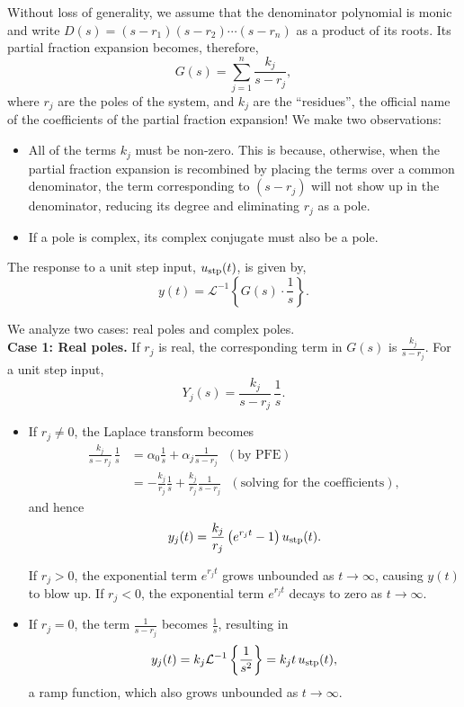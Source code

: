 Without loss of generality, we assume that the denominator polynomial is monic and write $D(s) = (s-r_1) (s - r_2) \cdots (s-r_n)$ as a product of its roots. Its partial fraction expansion becomes, therefore, 
\[
G(s) = \sum_{j=1}^n \frac{k_j}{s - r_j},
\]
where \(r_j\) are the poles of the system, and \(k_j\) are the ``residues'', the official name of the coefficients of the partial fraction expansion! We make two observations:
\begin{itemize}
    \item All of the terms $k_j$ must be non-zero. This is because, otherwise, when the partial fraction expansion is recombined by placing the terms over a common denominator, the term corresponding to $(s - r_j)$ will not show up in the denominator, reducing its degree and eliminating $r_j$ as a pole. 

    \item If a pole is complex, its complex conjugate must also be a pole. 
\end{itemize}

The response to a unit step input, \(u_{\rm stp}(t)\), is given by,
\[
y(t) = \mathcal{L}^{-1} \left\{ G(s) \cdot \frac{1}{s} \right\}.
\]

We analyze two cases: real poles and complex poles.\\

\textbf{Case 1: Real poles.}  
If \(r_j\) is real, the corresponding term in \(G(s)\) is \(\frac{k_j}{s - r_j}\). For a unit step input,
\[
Y_j(s)  = \frac{k_j}{s - r_j} \, \frac{1}{s}.  
\]
\begin{itemize}
    \item If \(r_j \neq 0\), the Laplace transform becomes
    \[
\begin{aligned}
  \frac{k_j}{s - r_j} \, \frac{1}{s}  & = \alpha_0 \frac{1}{s} + \alpha_j \frac{1}{s - r_j}  ~~~(\text{by PFE})\\
     & = -\frac{k_j}{r_j} \frac{1}{s} + \frac{k_j}{r_j} \frac{1}{s - r_j} ~~~(\text{solving for the coefficients}),
\end{aligned}
\]
and hence 
\[  y_j(t) = \frac{k_j}{r_j} \left( e^{r_j t} -1\right) u_{\rm stp}(t). \]

 
    If $r_j>0$, the exponential term \(e^{r_j t}\) grows unbounded as \(t \to \infty\), causing \(y(t)\) to blow up. If $r_j<0$, the exponential term \(e^{r_j t}\) decays to zero as \(t \to \infty\).
\item If \(r_j = 0\), the term \(\frac{1}{s - r_j}\) becomes \(\frac{1}{s}\), resulting in 
\[
y_j(t) =  k_j \mathcal{L}^{-1} \left\{ \frac{1}{s^2} \right\} = k_j t \, u_{\rm stp}(t),
\]
a ramp function, which also grows unbounded as \(t \to \infty\).
\end{itemize}


